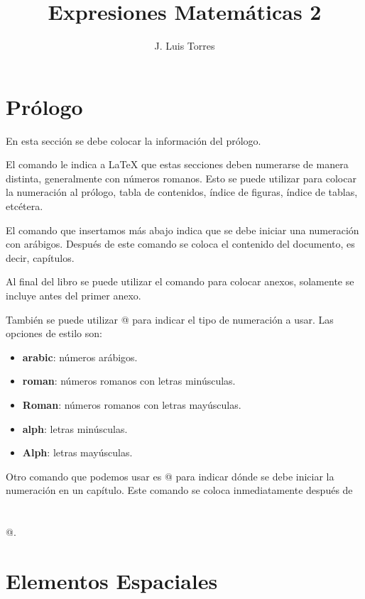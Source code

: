 \documentclass[letterpaper,12pt]{book}
\title{Expresiones Matemáticas 2}
\author{J. Luis Torres}
\begin{document}
\maketitle
\frontmatter
\tableofcontents

\chapter{Prólogo}

En esta sección se debe colocar la información del prólogo.

El comando \verb@\frontmatter@ le indica a \LaTeX{} que estas secciones deben numerarse de manera distinta,
generalmente con números romanos. Esto se puede utilizar para colocar la numeración al prólogo, 
tabla de contenidos, índice de figuras, índice de tablas, etcétera.

El comando \verb@\mainmatter@ que insertamos más abajo indica que se debe iniciar una 
numeración con arábigos. Después de este comando se coloca el contenido del documento, es decir, capítulos.

Al final del libro se puede utilizar el comando \verb@\appendix@ para colocar anexos, solamente se incluye antes del primer anexo. 

También se puede utilizar \verb@{}@ para indicar el tipo de numeración a usar. Las opciones
de estilo son: 

\begin{itemize}
	\item \textbf{arabic}: números arábigos. 
	\item \textbf{roman}: números romanos con letras minúsculas. 
	\item \textbf{Roman}: números romanos con letras mayúsculas.
	\item \textbf{alph}: letras minúsculas. 
	\item \textbf{Alph}: letras mayúsculas.
\end{itemize}

Otro comando que podemos usar es \verb@\setcounter{page}{número}@ para indicar dónde se debe iniciar la numeración
en un capítulo. Este comando se coloca inmediatamente después de \verb@\chapter{}@.

\mainmatter

\chapter{Elementos Espaciales}
\end{document}
